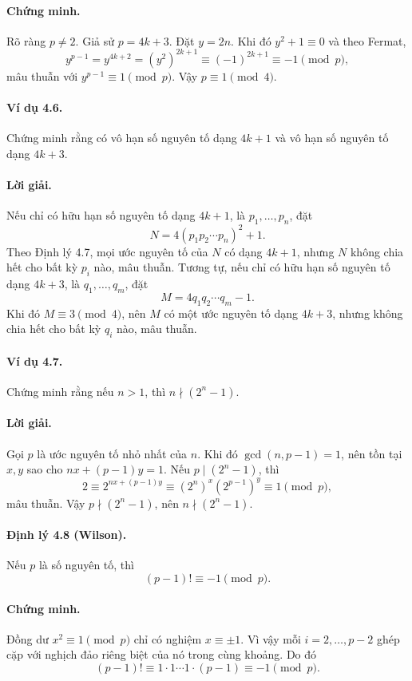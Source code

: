 \documentclass[11pt]{article}
\begin{document}
\paragraph{Chứng minh.}
Rõ ràng \(p\ne2\). Giả sử \(p=4k+3\). Đặt \(y=2n\). Khi đó \(y^2+1\equiv0\)
và theo Fermat,
\[
 y^{p-1}=y^{4k+2}=(y^2)^{2k+1}\equiv(-1)^{2k+1}\equiv-1\pmod p,
\]
mâu thuẫn với \(y^{p-1}\equiv1\pmod p\). Vậy \(p\equiv1\pmod4\).

\paragraph{Ví dụ 4.6.}
Chứng minh rằng có vô hạn số nguyên tố dạng \(4k+1\) và vô hạn số nguyên tố
dạng \(4k+3\).

\paragraph{Lời giải.}
Nếu chỉ có hữu hạn số nguyên tố dạng \(4k+1\), là \(p_1,\ldots,p_n\), đặt
\[
 N=4(p_1p_2\cdots p_n)^2+1.
\]
Theo Định lý 4.7, mọi ước nguyên tố của \(N\) có dạng \(4k+1\), nhưng \(N\)
không chia hết cho bất kỳ \(p_i\) nào, mâu thuẫn. Tương tự, nếu chỉ có hữu hạn
số nguyên tố dạng \(4k+3\), là \(q_1,\ldots,q_m\), đặt
\[
 M=4q_1q_2\cdots q_m-1.
\]
Khi đó \(M\equiv3\pmod4\), nên \(M\) có một ước nguyên tố dạng \(4k+3\), nhưng
không chia hết cho bất kỳ \(q_i\) nào, mâu thuẫn.

\paragraph{Ví dụ 4.7.}
Chứng minh rằng nếu \(n>1\), thì \(n\nmid(2^n-1)\).

\paragraph{Lời giải.}
Gọi \(p\) là ước nguyên tố nhỏ nhất của \(n\). Khi đó \(\gcd(n,p-1)=1\), nên
tồn tại \(x,y\) sao cho \(nx+(p-1)y=1\). Nếu \(p\mid(2^n-1)\), thì
\[
 2\equiv2^{nx+(p-1)y}\equiv(2^n)^x(2^{p-1})^y\equiv1\pmod p,
\]
mâu thuẫn. Vậy \(p\nmid(2^n-1)\), nên \(n\nmid(2^n-1)\).

\paragraph{Định lý 4.8 (Wilson).}
Nếu \(p\) là số nguyên tố, thì
\[
 (p-1)!\equiv-1\pmod p.
\]

\paragraph{Chứng minh.}
Đồng dư \(x^2\equiv1\pmod p\) chỉ có nghiệm \(x\equiv\pm1\). Vì vậy mỗi
\(i=2,\ldots,p-2\) ghép cặp với nghịch đảo riêng biệt của nó trong cùng khoảng.
Do đó
\[
 (p-1)!\equiv1\cdot1\cdots1\cdot(p-1)\equiv-1\pmod p.
\]
\end{document}
